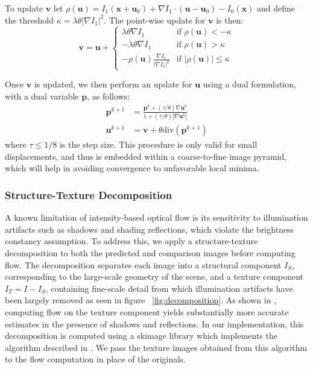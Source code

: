 \documentclass[10pt,twocolumn]{article}
\begin{document}
To update $\mathbf{v}$ let $\rho(\mathbf{u}) = I_1(\mathbf{x} + \mathbf{u}_0) + \nabla I_1 \cdot (\mathbf{u} - \mathbf{u}_0) - I_0(\mathbf{x})$ and define the threshold $\kappa = \lambda \theta |\nabla I_1|^2$. The point-wise update for $\mathbf{v}$ is then:
\begin{equation}
\mathbf{v} = \mathbf{u} + 
\begin{cases} 
\lambda \theta \nabla I_1 & \text{if } \rho(\mathbf{u}) < -\kappa \\
-\lambda \theta \nabla I_1 & \text{if } \rho(\mathbf{u}) > \kappa \\
-\rho(\mathbf{u}) \frac{\nabla I_1}{|\nabla I_1|^2} & \text{if } |\rho(\mathbf{u})| \leq \kappa
\end{cases}
\end{equation}

Once $\mathbf{v}$ is updated, we then perform an update for $\mathbf{u}$ using a dual formulation, with a dual variable $\mathbf{p}$, as follows:
\begin{align}
    \mathbf{p}^{k+1} &= \frac{\mathbf{p}^k + (\tau/\theta) \nabla \mathbf{u}^k}{1 + (\tau/\theta) |\nabla \mathbf{u}^k|} \\
    \mathbf{u}^{k+1} &= \mathbf{v} + \theta \text{div}(\mathbf{p}^{k+1})
\end{align}
where $\tau \leq 1/8$ is the step size. This procedure is only valid for small displacements, and thus is embedded within a coarse-to-fine image pyramid, which will help in avoiding convergence to unfavorable local minima.

\subsubsection{Structure-Texture Decomposition}

A known limitation of intensity-based optical flow is its sensitivity to illumination artifacts such as shadows and shading reflections, which violate the brightness constancy assumption. To address this, we apply a structure-texture decomposition to both the predicted and comparison images before computing flow. The decomposition separates each image into a structural component $I_S$, corresponding to the large-scale geometry of the scene, and a texture component $I_T = I - I_S$, containing fine-scale detail from which illumination artifacts have been largely removed as seen in figure ~\ref{fig:decomposition}. As shown in \cite{wedel2009}, computing flow on the texture component yields substantially more accurate estimates in the presence of shadows and reflections. In our implementation, this decomposition is computed using a skimage library which implements the algorithm described in \cite{chambolle2004tv}. We pass the texture images obtained from this algorithm to the flow computation in place of the originals.
\end{document}

